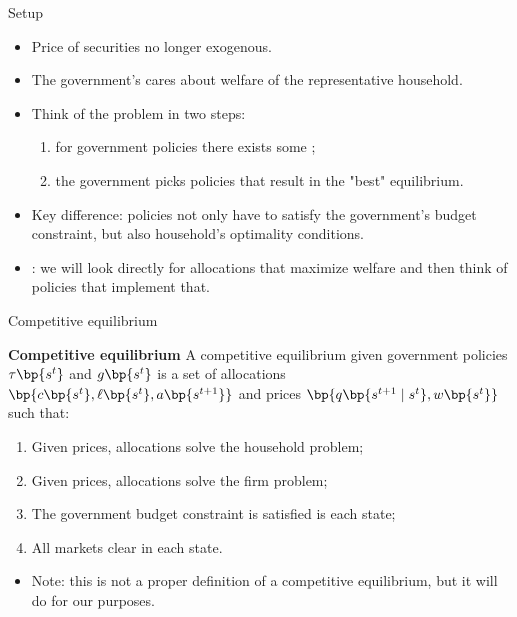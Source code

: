 \documentclass[11pt,xcolor={dvipsnames},hyperref={pdftex,pdfpagemode=UseNone,hidelinks,pdfdisplaydoctitle=true},usepdftitle=false]{beamer}
\begin{document}
    \begin{frame}{Setup}
    \begin{itemize}
    \item Price of securities no longer exogenous.
    \item The government's cares about welfare of the representative household.
    \item Think of the problem in two steps:
    \begin{enumerate} 
        \item for  government policies there exists some ;
        \item the government picks policies that result in the "best" equilibrium.
    \end{enumerate}
    \item Key difference: policies not only have to satisfy the government's budget constraint, but also household's optimality conditions.
    \item {}: we will look directly for allocations that maximize welfare and then think of policies that implement that.
    \end{itemize}
    \end{frame}
    \begin{frame}{Competitive equilibrium}
        \begin{beamerboxesrounded}[upper=block head,lower=block body,shadow=false]{\textbf{Competitive equilibrium}}
            A competitive equilibrium given government policies $\tau\bp{s^t}$ and $g\bp{s^t}$ is a set of allocations $\bp{c\bp{s^t},\ell\bp{s^t},a\bp{s^{t+1}}}$ and prices $\bp{q\bp{s^{t+1} \mid s^t },w\bp{s^t}}$ such that: 
            \begin{enumerate}
                \item Given prices, allocations solve the household problem;
                \item Given prices, allocations solve the firm problem;
                \item The government budget constraint is satisfied is each state;
                \item All markets clear in each state.
            \end{enumerate}
        \end{beamerboxesrounded}

        \begin{itemize}
            \item Note: this is not a proper definition of a competitive equilibrium, but it will do for our purposes.
        \end{itemize}
        \end{frame}
    
\end{document}
